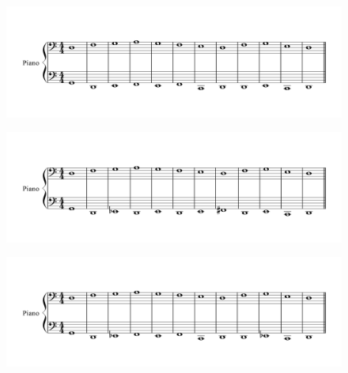 \begin{figure}[h!]
  \includegraphics[width=5in]{example-composition-images/10-1.png}
\end{figure}
\begin{figure}[h!]
  \includegraphics[width=5in]{example-composition-images/11-1.png}
\end{figure}
\begin{figure}[h!]
  \includegraphics[width=5in]{example-composition-images/12-1.png}
\end{figure}

